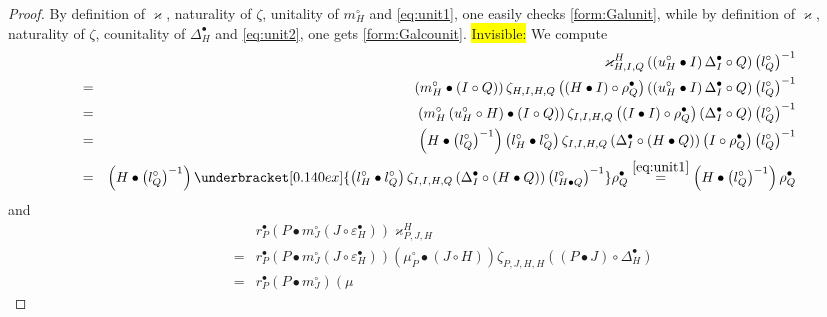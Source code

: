 \documentclass[nosumlimits,twoside]{amsart}
\theoremstyle{definition}
\theoremstyle{remark}
\newenvironment{invisible}{{\noindent\sc \colorbox{yellow}{Invisible:}\;}\color{gray}}{\medskip}
\begin{document}
\begin{proof}
By definition of $\varkappa$, naturality of $\zeta$, unitality of $m_{H}^{\circ }$ and \eqref{eq:unit1}, one easily checks \eqref{form:Galunit}, while by definition of $\varkappa$, naturality of $\zeta$, counitality of $\Delta_{H}^{\bullet}$ and \eqref{eq:unit2}, one gets \eqref{form:Galcounit}.
\begin{invisible}
We compute%
\begin{eqnarray*}
&&\varkappa _{H,I,Q}^{H}\left( \left( u_{H}^{\circ }\bullet I\right) \Delta
_{I}^{\bullet }\circ Q\right) \left( l_{Q}^{\circ }\right) ^{-1} \\
&=&\left( m_{H}^{\circ }\bullet \left( I\circ Q\right) \right) \zeta
_{H,I,H,Q}\left( \left( H\bullet I\right) \circ \rho _{Q}^{\bullet }\right)
\left( \left( u_{H}^{\circ }\bullet I\right) \Delta _{I}^{\bullet }\circ
Q\right) \left( l_{Q}^{\circ }\right) ^{-1} \\
&=&\left( m_{H}^{\circ }\left( u_{H}^{\circ }\circ H\right) \bullet \left(
I\circ Q\right) \right) \zeta _{I,I,H,Q}\left( \left( I\bullet I\right)
\circ \rho _{Q}^{\bullet }\right) \left( \Delta _{I}^{\bullet }\circ
Q\right) \left( l_{Q}^{\circ }\right) ^{-1} \\
&=&\left( H\bullet \left( l_{Q}^{\circ }\right) ^{-1}\right) \left(
l_{H}^{\circ }\bullet l_{Q}^{\circ }\right) \zeta _{I,I,H,Q}\left( \Delta
_{I}^{\bullet }\circ \left( H\bullet Q\right) \right) \left( I\circ \rho
_{Q}^{\bullet }\right) \left( l_{Q}^{\circ }\right) ^{-1} \\
&=&\left( H\bullet \left( l_{Q}^{\circ }\right) ^{-1}\right) %
\underbracket[0.140ex]{\left( l_{H}^{\circ }\bullet l_{Q}^{\circ }\right)
\zeta _{I,I,H,Q}\left( \Delta _{I}^{\bullet }\circ \left( H\bullet Q\right)
\right) \left( l_{H\bullet Q}^{\circ }\right) ^{-1}}\rho _{Q}^{\bullet } \overset{\eqref{eq:unit1}}=\left( H\bullet \left( l_{Q}^{\circ }\right) ^{-1}\right) \rho
_{Q}^{\bullet }
\end{eqnarray*}%
and%
\begin{eqnarray*}
&&r_{P}^{\bullet }\left( P\bullet m_{J}^{\circ }\left( J\circ \varepsilon
_{H}^{\bullet }\right) \right) \varkappa _{P,J,H}^{H} \\
&=&r_{P}^{\bullet }\left( P\bullet m_{J}^{\circ }\left( J\circ \varepsilon
_{H}^{\bullet }\right) \right) \left( \mu _{P}^{\circ }\bullet \left( J\circ
H\right) \right) \zeta _{P,J,H,H}\left( \left( P\bullet J\right) \circ
\Delta _{H}^{\bullet }\right)  \\
&=&r_{P}^{\bullet }\left( P\bullet m_{J}^{\circ }\right) \left( \mu

\end{eqnarray*}
\end{invisible}
\end{proof}
\end{document}
